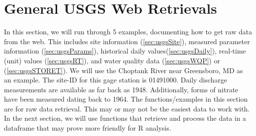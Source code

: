 \documentclass[a4paper,11pt]{article}\usepackage[]{graphicx}\usepackage[]{color}
\begin{document}
\section{General USGS Web Retrievals}
In this section, we will run through 5 examples, documenting how to get raw data from the web. This includes site information (\ref{sec:usgsSite}), measured parameter information (\ref{sec:usgsParams}), historical daily values(\ref{sec:usgsDaily}), real-time (unit) values (\ref{sec:usgsRT}), and water quality data (\ref{sec:usgsWQP}) or (\ref{sec:usgsSTORET}). We will use the Choptank River near Greensboro, MD as an example.  The site-ID for this gage station is 01491000. Daily discharge measurements are available as far back as 1948.  Additionally, forms of nitrate have been measured dating back to 1964. The functions/examples in this section are for raw data retrieval.  This may or may not be the easiest data to work with.  In the next section, we will use functions that retrieve and process the data in a dataframe that may prove more friendly for R analysis.
\end{document}
